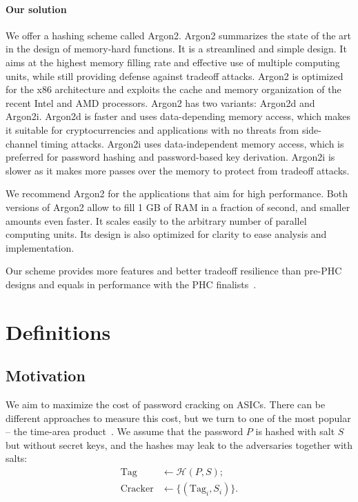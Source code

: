 \documentclass[a4paper]{article}
\begin{document}
\paragraph{Our solution} We offer a hashing scheme called  \textsf{Argon2}.
 \textsf{Argon2} summarizes the state of the art in the design of memory-hard functions. It is a streamlined and simple design. It aims at the highest memory filling rate and effective use of multiple computing units, while still
providing defense against tradeoff attacks. \textsf{Argon2} is optimized for the x86 architecture and exploits the cache and memory organization of the recent Intel and AMD processors. \textsf{Argon2} has two variants: \textsf{Argon2d} and \textsf{Argon2i}. \textsf{Argon2d} is faster and uses data-depending memory access, which makes it suitable for cryptocurrencies and applications with no threats from side-channel timing attacks. \textsf{Argon2i} uses data-independent memory access, which is preferred for password hashing and password-based key derivation. \textsf{Argon2i} is slower as it makes more passes over the memory to protect from tradeoff attacks.


We recommend \textsf{Argon2} for the applications that aim for high performance. Both versions of \textsf{Argon2} allow to fill 1 GB of RAM in a fraction of second, and smaller amounts even faster. It scales easily to the arbitrary number of parallel computing units. Its design is also optimized for clarity to ease analysis and implementation.

Our scheme provides more features and better tradeoff resilience than pre-PHC designs and equals in performance with the  PHC finalists~\cite{broz15}. 

\section{Definitions}

\subsection{Motivation}\label{sec:costs}
We aim to maximize the cost of password cracking on ASICs. There can be different approaches to measure this cost, but we turn to one of the most popular -- the time-area product~\cite{Thompson79,BernsteinL13}. We assume that the password $P$ is hashed with salt $S$ but without secret keys, and the hashes may leak to the adversaries together with salts:
$$
\begin{aligned}
\mathrm{Tag} &\leftarrow \mathcal{H}(P,S);\\
\mathrm{Cracker} &\leftarrow \{(\mathrm{Tag}_i, S_i)\}.
\end{aligned}
$$
\end{document}
